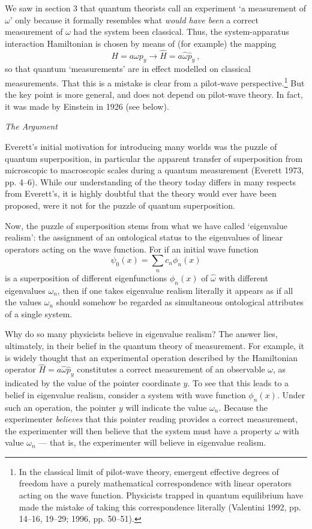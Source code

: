 \documentclass[12pt]{article}%
\begin{document}
We saw in section 3 that quantum theorists call an experiment `a measurement
of $\omega$' only because it formally resembles what \textit{would have been}
a correct measurement of $\omega$ had the system been classical. Thus, the
system-apparatus interaction Hamiltonian is chosen by means of (for example)
the mapping%
\begin{equation}
H=a\omega p_{y}\longrightarrow\hat{H}=a\hat{\omega}\hat{p}_{y}\ , \label{Map}%
\end{equation}
so that quantum `measurements' are in effect modelled on classical
measurements. That this is a mistake is clear from a pilot-wave
perspective.\footnote{In the classical limit of pilot-wave theory, emergent
effective degrees of freedom have a purely mathematical correspondence with
linear operators acting on the wave function. Physicists trapped in quantum
equilibrium have made the mistake of taking this correspondence literally
(Valentini 1992, pp. 14--16, 19--29; 1996, pp. 50--51).} But the key point is
more general, and does not depend on pilot-wave theory. In fact, it was made
by Einstein in 1926 (see below).

\begin{center}
\textit{The Argument}
\end{center}

Everett's initial motivation for introducing many worlds was the puzzle of
quantum superposition, in particular the apparent transfer of superposition
from microscopic to macroscopic scales during a quantum measurement (Everett
1973, pp. 4--6). While our understanding of the theory today differs in many
respects from Everett's, it is highly doubtful that the theory would ever have
been proposed, were it not for the puzzle of quantum superposition.

Now, the puzzle of superposition stems from what we have called `eigenvalue
realism': the assignment of an ontological status to the eigenvalues of linear
operators acting on the wave function. For if an initial wave function%
\[
\psi_{0}(x)=\sum_{n}c_{n}\phi_{n}(x)
\]
is a superposition of different eigenfunctions $\phi_{n}(x)$ of $\hat{\omega}$
with different eigenvalues $\omega_{n}$, then if one takes eigenvalue realism
literally it appears as if all the values $\omega_{n}$ should somehow be
regarded as simultaneous ontological attributes of a single system.

Why do so many physicists believe in eigenvalue realism? The answer lies,
ultimately, in their belief in the quantum theory of measurement. For example,
it is widely thought that an experimental operation described by the
Hamiltonian operator $\hat{H}=a\hat{\omega}\hat{p}_{y}$ constitutes a correct
measurement of an observable $\omega$, as indicated by the value of the
pointer coordinate $y$. To see that this leads to a belief in eigenvalue
realism, consider a system with wave function $\phi_{n}(x)$. Under such an
operation, the pointer $y$ will indicate the value $\omega_{n}$. Because the
experimenter \textit{believes} that this pointer reading provides a correct
measurement, the experimenter will then believe that the system must have a
property $\omega$ with value $\omega_{n}$ --- that is, the experimenter will
believe in eigenvalue realism.
\end{document}
